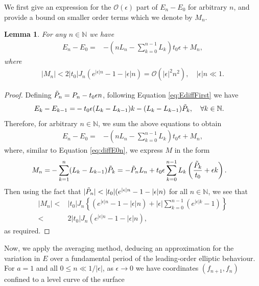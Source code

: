 \documentclass[reqno,a4paper]{amsart}
\numberwithin{equation}{section}
\theoremstyle{plain}
\newtheorem{lemma}[theorem]{Lemma}
\theoremstyle{remark}
\begin{document}
We first give an expression for the $\mathcal{O}(\epsilon)$ part of $E_n-E_{0}$ for arbitrary $n$, and provide a bound on smaller order terms which we denote by $M_n$.
\begin{lemma}\label{lem:diffEn0}
    For any $n\in\mathbb{N}$ we have
    \begin{align}\label{eq:difference}
        E_n-E_{0}=&-\left(nL_n-\sum_{k=0}^{n-1}L_k\right)t_0\epsilon+M_n,
    \end{align}
    where
    \begin{align*}
        |M_n|<2|t_0|J_n\left(e^{|\epsilon|n}-1-|\epsilon|n\right)=\mathcal{O}\left(|\epsilon|^2n^2\right),\quad|\epsilon|n\ll1.
    \end{align*}
\end{lemma}
\begin{proof}
    Defining $\Tilde{P}_n=P_n-t_0\epsilon n$, following Equation \eqref{eq:EdiffFirst} we have
    \begin{align*}
        E_k-E_{k-1}=&-t_0\epsilon(L_k-L_{k-1})k-(L_k-L_{k-1})\Tilde{P}_k,\quad \forall k\in\mathbb{N}.
    \end{align*}
    Therefore, for arbitrary $n\in\mathbb{N}$, we sum the above equations to obtain
    \begin{align*}
        E_n-E_{0}=&-\left(nL_n-\sum_{k=0}^{n-1}L_k\right)t_0\epsilon+M_n,
    \end{align*}
    where, similar to Equation \eqref{eq:diffE0n}, we express $M$ in the form
    \begin{align*}
        M_n=&-\sum_{k=1}^{n}(L_k-L_{k-1})\Tilde{P}_k=-\Tilde{P}_nL_n+t_0\epsilon\sum_{k=0}^{n-1}L_k\left(\frac{\Tilde{P}_k}{t_0}+\epsilon k\right).
    \end{align*}
    Then using the fact that $|\Tilde{P}_n|<|t_0|(e^{|\epsilon|n}-1-|\epsilon|n)$ for all $n\in\mathbb{N}$, we see that
    \begin{align*}
        |M_n|<&|t_0|J_n\left\{\left(e^{|\epsilon|n}-1-|\epsilon|n\right)+|\epsilon|\sum_{k=0}^{n-1}\left(e^{|\epsilon|k}-1\right)\right\}\\
        <&2|t_0|J_n\left(e^{|\epsilon|n}-1-|\epsilon|n\right),
    \end{align*}
    as required.
\end{proof}
Now, we apply the averaging method, deducing an approximation for the variation in $E$ over a fundamental period of the leading-order elliptic behaviour. For $a=1$ and all $0\leq n\ll1/|\epsilon|$, as $\epsilon\to0$ we have coordinates $(f_{n+1},f_n)$ confined to a level curve of the surface
\end{document}
